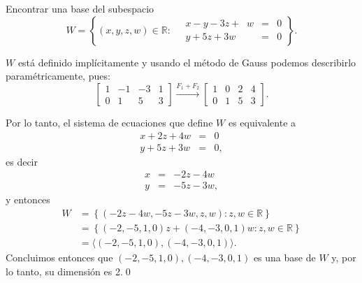 \documentclass[handout]{beamer} %
\begin{document}
\begin{frame}
        
\begin{ejemplo}
    Encontrar una base del subespacio 
    $$
    W = \left\{(x,y,z,w) \in \mathbb{R}: \quad\begin{array}{rcl}
    x-y -3z +\;\;w &=& 0 \\ y +5z +3w &=& 0
    \end{array} \right\}.
    $$
\end{ejemplo}\pause
\begin{solucion}\pause
    $W$  está definido implícitamente y usando el método de Gauss podemos describirlo paramétricamente, pues:
    \begin{equation*}
    \begin{bmatrix}1&-1&-3&1 \\ 0&1&5&3  \end{bmatrix}
    \stackrel{F_1+F_2}{\longrightarrow} 
    \begin{bmatrix}1&0&2&4 \\ 0&1&5&3  \end{bmatrix}.
    \end{equation*}
\end{solucion}
\end{frame}


\begin{frame}
Por lo tanto, el sistema de ecuaciones que define $W$ es equivalente a 
\begin{equation*}
\begin{array}{rcl}
x  +2z +4w &=& 0 \\ y +5z +3w &=& 0,
\end{array}
\end{equation*}
es decir 
\begin{equation*}
\begin{array}{rcl}
x  &=& -2z - 4w  \\ y &=& -5z -3w ,
\end{array}
\end{equation*}
y entonces
\begin{align*}
W &= \left\{(-2z -4w,-5z -3w,z,w) : z,w\in \mathbb{R} \right\} \\
&= \left\{(-2,-5,1,0)z+(-4, -3,0,1)w : z,w\in \mathbb{R} \right\}\\
&= \langle (-2,-5,1,0),(-4, -3,0,1)\rangle.
\end{align*}
Concluimos entonces que $(-2,-5,1,0),(-4, -3,0,1)$  es una base de $W$ y, por lo tanto,  su dimensión es 2.\qed
\end{frame}
\end{document}
